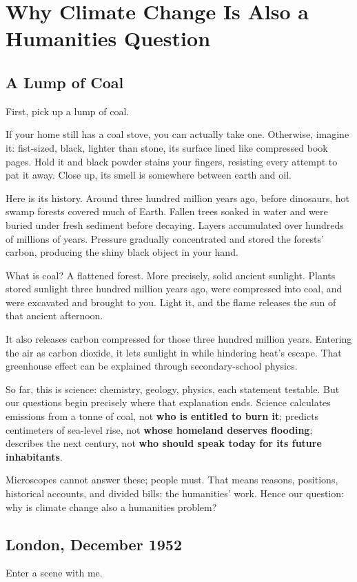 \chapter[Climate Change and the Humanities]{Why Climate Change Is Also a Humanities Question}
\section{A Lump of Coal}
First, pick up a lump of coal.

If your home still has a coal stove, you can actually take one. Otherwise, imagine it: fist-sized, black, lighter than stone, its surface lined like compressed book pages. Hold it and black powder stains your fingers, resisting every attempt to pat it away. Close up, its smell is somewhere between earth and oil.

Here is its history. Around three hundred million years ago, before dinosaurs, hot swamp forests covered much of Earth. Fallen trees soaked in water and were buried under fresh sediment before decaying. Layers accumulated over hundreds of millions of years. Pressure gradually concentrated and stored the forests' carbon, producing the shiny black object in your hand.

What is coal? A flattened forest. More precisely, solid ancient sunlight. Plants stored sunlight three hundred million years ago, were compressed into coal, and were excavated and brought to you. Light it, and the flame releases the sun of that ancient afternoon.

It also releases carbon compressed for those three hundred million years. Entering the air as carbon dioxide, it lets sunlight in while hindering heat's escape. That greenhouse effect can be explained through secondary-school physics.

So far, this is science: chemistry, geology, physics, each statement testable. But our questions begin precisely where that explanation ends. Science calculates emissions from a tonne of coal, not \textbf{who is entitled to burn it}; predicts centimeters of sea-level rise, not \textbf{whose homeland deserves flooding}; describes the next century, not \textbf{who should speak today for its future inhabitants}.

Microscopes cannot answer these; people must. That means reasons, positions, historical accounts, and divided bills: the humanities' work. Hence our question: why is climate change also a humanities problem?

\section{London, December 1952}
Enter a scene with me.

